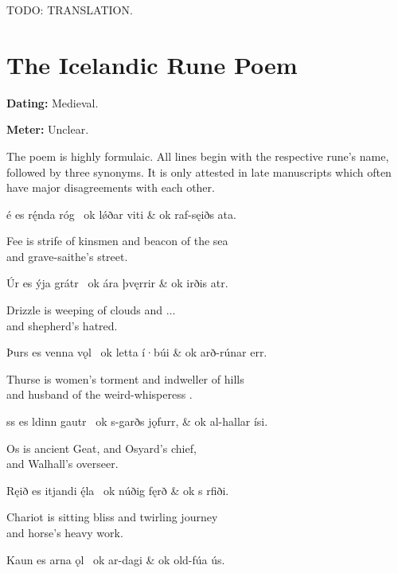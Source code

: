 \bvb TODO: TRANSLATION.\evb\evg

\sectionline

\section{The Icelandic Rune Poem}

\begin{flushright}%
\textbf{Dating:} Medieval.%

\textbf{Meter:} Unclear.
\end{flushright}%

The poem is highly formulaic.  All lines begin with the respective rune’s name, followed by three synonyms.  It is only attested in late manuscripts which often have major disagreements with each other.

\sectionline

\bvg\bva {}é es rę́nda róg \hld\ ok lǿðar viti &
\ind ok raf-sęiðs ata.\eva

\bvb Fee is strife of kinsmen and beacon of the sea \\
and grave-saithe’s  street.\evb\evg


\bvg\bva Úr es ýja grátr \hld\ ok ára þvęrrir &
\ind ok irðis atr.\eva

\bvb Drizzle is weeping of clouds and ... \\
and shepherd’s hatred.\evb\evg


\bvg\bva Þurs es venna vǫl \hld\ ok letta í·búi &
\ind ok arð-rúnar err.\eva

\bvb Thurse is women’s torment and indweller of hills \\
and husband of the weird-whisperess .\evb\evg


\bvg\bva {}ss es ldinn gautr \hld\ ok s-garðs jǫfurr, &
\ind ok al-hallar ísi.\eva

\bvb Os is ancient Geat, and Osyard’s chief, \\
and Walhall’s overseer.\evb\evg


\bvg\bva Ręið es itjandi ę́la \hld\ ok núðig fęrð &
\ind ok s rfiði.\eva

\bvb Chariot is sitting bliss and twirling journey \\
and horse’s heavy work.\evb\evg


\bvg\bva Kaun es arna ǫl \hld\ ok ar-dagi &
\ind ok old-fúa ús.\eva

